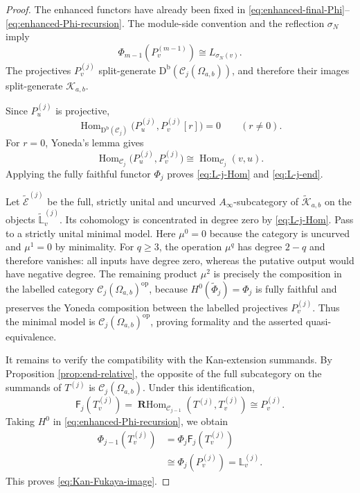 \documentclass[12pt,a4paper,english,reqno]{amsart}
\theoremstyle{plain}
\theoremstyle{definition}
\newcommand{\Db}{\mathrm D^{\mathrm b}}
\newcommand{\Hom}{\operatorname{Hom}}
\newcommand{\RHom}{\operatorname{\mathbf{R}Hom}}
\newcommand{\op}{\mathrm{op}}
\newcommand{\C}{\mathcal C}
\begin{document}
\begin{proof}
The enhanced functors have already been fixed in
\eqref{eq:enhanced-final-Phi}--\eqref{eq:enhanced-Phi-recursion}.  The
module-side convention and the reflection $\sigma_N$ imply
\[
 \Phi_{m-1}(P_v^{(m-1)})
 \cong L_{\sigma_N(v)}.
 \]
The projectives $P_v^{(j)}$ split-generate
$\Db(\C_j(\Omega_{a,b}))$, and therefore their images split-generate
$\mathcal K_{a,b}$.

Since $P_u^{(j)}$ is projective,
\[
 \Hom_{\Db(\C_j)}
 \bigl(P_u^{(j)},P_v^{(j)}[r]\bigr)=0
 \qquad(r\neq0).
 \]
For $r=0$, Yoneda's lemma gives
\[
 \Hom_{\C_j}
 \bigl(P_u^{(j)},P_v^{(j)}\bigr)
 \cong
 \Hom_{\C_j}(v,u).
 \]
Applying the fully faithful functor $\Phi_j$ proves
\eqref{eq:L-j-Hom} and \eqref{eq:L-j-end}.

Let $\widetilde{\mathcal E}^{(j)}$ be the full, strictly unital and
uncurved $A_\infty$-subcategory of $\widetilde{\mathcal K}_{a,b}$ on the
objects $\widetilde{\mathbb L}_v^{(j)}$.  Its cohomology is concentrated in
degree zero by \eqref{eq:L-j-Hom}.  Pass to a strictly unital minimal model.
Here $\mu^0=0$ because the category is uncurved and $\mu^1=0$ by
minimality.  For $q\geq3$, the operation $\mu^q$ has degree $2-q$ and
therefore vanishes: all inputs have degree zero, whereas the putative output
would have negative degree.  The remaining product $\mu^2$ is precisely the
composition in the labelled category $\C_j(\Omega_{a,b})^{\op}$, because
$H^0(\widetilde\Phi_j)=\Phi_j$ is fully faithful and preserves the Yoneda
composition between the labelled projectives $P_v^{(j)}$.  Thus the minimal
model is $\C_j(\Omega_{a,b})^{\op}$, proving formality and the asserted
quasi-equivalence.

It remains to verify the compatibility with the Kan-extension summands.
By Proposition \ref{prop:end-relative}, the opposite of the full subcategory
on the summands of $T^{(j)}$ is $\C_j(\Omega_{a,b})$.  Under this
identification,
\begin{equation}
 \mathsf F_j(T_v^{(j)})
 =
 \RHom_{\C_{j-1}}(T^{(j)},T_v^{(j)})
 \cong
 P_v^{(j)}.
\label{eq:Fj-Tv}
\end{equation}
Taking $H^0$ in \eqref{eq:enhanced-Phi-recursion}, we obtain
\[
\begin{split}
 \Phi_{j-1}(T_v^{(j)})
 &=
 \Phi_j\mathsf F_j(T_v^{(j)})\\
 &\cong
 \Phi_j(P_v^{(j)})
 =
 \mathbb L_v^{(j)}.
\end{split}
\]
This proves \eqref{eq:Kan-Fukaya-image}.
\end{proof}
\end{document}
